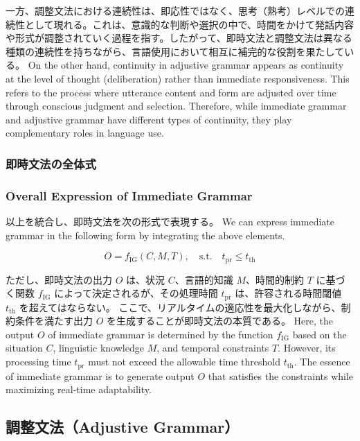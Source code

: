 \documentclass[a4paper,xelatex,ja=standard]{bxjsarticle}
\begin{document}
\ifJPN
一方、調整文法における連続性は、即応性ではなく、思考（熟考）レベルでの連続性として現れる。これは、意識的な判断や選択の中で、時間をかけて発話内容や形式が調整されていく過程を指す。したがって、即時文法と調整文法は異なる種類の連続性を持ちながら、言語使用において相互に補完的な役割を果たしている。
\else
On the other hand, continuity in adjustive grammar appears as continuity at the level of thought (deliberation) rather than immediate responsiveness. This refers to the process where utterance content and form are adjusted over time through conscious judgment and selection. Therefore, while immediate grammar and adjustive grammar have different types of continuity, they play complementary roles in language use.
\fi

\ifJPN
\subsubsection{即時文法の全体式}
\else
\subsubsection{Overall Expression of Immediate Grammar}
\fi

\ifJPN
以上を統合し、即時文法を次の形式で表現する。
\else
We can express immediate grammar in the following form by integrating the above elements.
\fi

\[
O = f_{\text{IG}}(C, M, T), \quad \text{s.t.} \quad t_{\text{pr}} \leq t_{\text{th}}
\]

\ifJPN
ただし、即時文法の出力 \( O \) は、状況 \( C \)、言語的知識 \( M \)、時間的制約 \( T \) に基づく関数 \( f_{\text{IG}} \) によって決定されるが、その処理時間 \( t_{\text{pr}} \) は、許容される時間閾値 \( t_{\text{th}} \) を超えてはならない。  
ここで、リアルタイムの適応性を最大化しながら、制約条件を満たす出力 \( O \) を生成することが即時文法の本質である。
\else
  Here, the output \( O \) of immediate grammar is determined by the function \( f_{\text{IG}} \) based on the situation \( C \), linguistic knowledge \( M \), and temporal constraints \( T \). However, its processing time \( t_{\text{pr}} \) must not exceed the allowable time threshold \( t_{\text{th}} \). The essence of immediate grammar is to generate output \( O \) that satisfies the constraints while maximizing real-time adaptability.
\fi

%

\ifJPN
  \subsection{調整文法（Adjustive Grammar）}
\else
\end{document}
